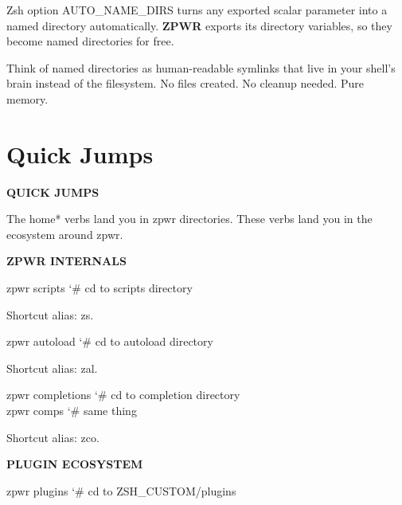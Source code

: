 \documentclass[11pt,a4paper,twoside]{book}
\begin{document}
Zsh option AUTO\_NAME\_DIRS turns any exported scalar parameter into a named directory automatically. \textbf{ZPWR} exports its directory variables, so they become named directories for free.

Think of named directories as human-readable symlinks that live in your shell's brain instead of the filesystem. No files created. No cleanup needed. Pure memory.


\vspace{16pt}

\section{Quick Jumps}


\vspace{10pt}
{\large\bfseries\color{neoncyan} QUICK JUMPS}\vspace{6pt}

The home* verbs land you in zpwr directories. These verbs land you in the ecosystem around zpwr.


\vspace{12pt}
{\bfseries\color{neonyellow} \textbf{ZPWR} INTERNALS}\vspace{4pt}

\begin{codebox}
\color{neongreen}zpwr scripts       {\char`\#} cd to scripts directory\\
\end{codebox}

Shortcut alias: zs.

\begin{codebox}
\color{neongreen}zpwr autoload      {\char`\#} cd to autoload directory\\
\end{codebox}

Shortcut alias: zal.

\begin{codebox}
\color{neongreen}zpwr completions   {\char`\#} cd to completion directory\\
\color{neongreen}zpwr comps         {\char`\#} same thing\\
\end{codebox}

Shortcut alias: zco.


\vspace{12pt}
{\bfseries\color{neonyellow} PLUGIN ECOSYSTEM}\vspace{4pt}

\begin{codebox}
\color{neongreen}zpwr plugins       {\char`\#} cd to ZSH\_CUSTOM/plugins\\
\end{codebox}
\end{document}
